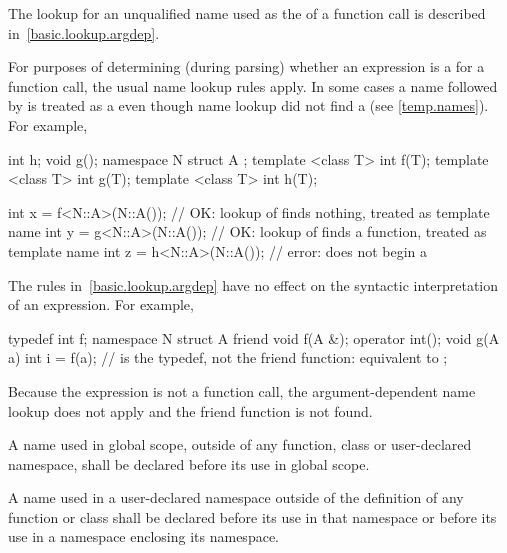\pnum
The lookup for an unqualified name used as the
 of a function call is described
in~\ref{basic.lookup.argdep}. \begin{note} For purposes of determining
(during parsing) whether an expression is a
 for a function call, the usual name lookup
rules apply.
In some cases
a name followed by \tcode{<} is treated as a 
even though name lookup did not find a 
(see \ref{temp.names}).
For example,
\begin{codeblock}
int h;
void g();
namespace N {
  struct A {};
  template <class T> int f(T);
  template <class T> int g(T);
  template <class T> int h(T);
}

int x = f<N::A>(N::A());        // OK: lookup of  finds nothing,  treated as template name
int y = g<N::A>(N::A());        // OK: lookup of  finds a function,  treated as template name
int z = h<N::A>(N::A());        // error:  does not begin a 
\end{codeblock}

The rules in~\ref{basic.lookup.argdep} have no effect on
the syntactic interpretation of an expression. For example,

\begin{codeblock}
typedef int f;
namespace N {
  struct A {
    friend void f(A &);
    operator int();
    void g(A a) {
      int i = f(a);             //  is the typedef, not the friend function: equivalent to 
    }
  };
}
\end{codeblock}

Because the expression is not a function call, the argument-dependent
name lookup does not apply and the friend
function  is not found. \end{note}

\pnum
A name used in global scope, outside of any function, class or
user-declared namespace, shall be declared before its use in global
scope.

\pnum
A name used in a user-declared namespace outside of the definition of
any function or class shall be declared before its use in that namespace
or before its use in a namespace enclosing its namespace.

